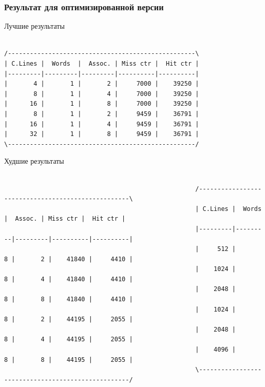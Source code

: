 \documentclass{beamer}
\begin{document}

\begin{frame}[fragile] %
\frametitle{Результат для оптимизированной версии}

\begin{block}{Лучшие результаты}
\begin{verbatim}

/---------------------------------------------------\
| C.Lines |  Words  |  Assoc. | Miss ctr |  Hit ctr |
|---------|---------|---------|----------|----------|
|       4 |       1 |       2 |     7000 |    39250 |
|       8 |       1 |       4 |     7000 |    39250 |
|      16 |       1 |       8 |     7000 |    39250 |
|       8 |       1 |       2 |     9459 |    36791 |
|      16 |       1 |       4 |     9459 |    36791 |
|      32 |       1 |       8 |     9459 |    36791 |
\---------------------------------------------------/

\end{verbatim}
\end{block}

\begin{block}{Худшие результаты}
\begin{verbatim}

                                                    /---------------------------------------------------\
                                                    | C.Lines |  Words  |  Assoc. | Miss ctr |  Hit ctr |
                                                    |---------|---------|---------|----------|----------|
                                                    |     512 |       8 |       2 |    41840 |     4410 |
                                                    |    1024 |       8 |       4 |    41840 |     4410 |
                                                    |    2048 |       8 |       8 |    41840 |     4410 |
                                                    |    1024 |       8 |       2 |    44195 |     2055 |
                                                    |    2048 |       8 |       4 |    44195 |     2055 |
                                                    |    4096 |       8 |       8 |    44195 |     2055 |
                                                    \---------------------------------------------------/

\end{verbatim}
\end{block}

\end{frame}
\end{document}
